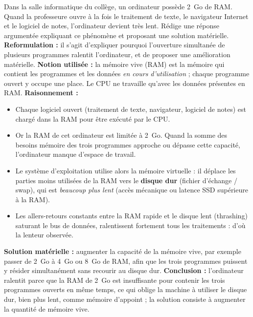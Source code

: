 \documentclass[11pt]{article}
\newcommand{\cle}[1]{{\popxbold\color{popdark}#1}}
\begin{document}
\begin{exoresolu}
Dans la salle informatique du collège, un ordinateur possède \SI{2}{Go} de RAM. Quand la professeure ouvre à la fois le traitement de texte, le navigateur Internet et le logiciel de notes, l'ordinateur devient très lent. Rédige une réponse argumentée expliquant ce phénomène et proposant une solution matérielle.
\tcblower
\textbf{Reformulation :} il s'agit d'expliquer pourquoi l'ouverture simultanée de plusieurs programmes ralentit l'ordinateur, et de proposer une amélioration matérielle.
\textbf{Notion utilisée :} la \cle{mémoire vive} (RAM) est la mémoire qui contient les programmes et les données \emph{en cours d'utilisation} ; chaque programme ouvert y occupe une place. Le CPU ne travaille qu'avec les données présentes en RAM.
\textbf{Raisonnement :}
\begin{itemize}
\item Chaque logiciel ouvert (traitement de texte, navigateur, logiciel de notes) est chargé dans la RAM pour être exécuté par le CPU.
\item Or la RAM de cet ordinateur est limitée à \SI{2}{Go}. Quand la somme des besoins mémoire des trois programmes approche ou dépasse cette capacité, l'ordinateur manque d'espace de travail.
\item Le système d'exploitation utilise alors la \cle{mémoire virtuelle} : il déplace les parties moins utilisées de la RAM vers le \textbf{disque dur} (fichier d'échange / swap), qui est \emph{beaucoup plus lent} (accès mécanique ou latence SSD supérieure à la RAM).
\item Les allers-retours constants entre la RAM rapide et le disque lent (thrashing) saturant le bus de données, ralentissent fortement tous les traitements : d'où la lenteur observée.
\end{itemize}
\textbf{Solution matérielle :} augmenter la capacité de la mémoire vive, par exemple passer de \SI{2}{Go} à \SI{4}{Go} ou \SI{8}{Go} de RAM, afin que les trois programmes puissent y résider simultanément sans recourir au disque dur.
\textbf{Conclusion :} l'ordinateur ralentit parce que la RAM de \SI{2}{Go} est insuffisante pour contenir les trois programmes ouverts en même temps, ce qui oblige la machine à utiliser le disque dur, bien plus lent, comme mémoire d'appoint ; la solution consiste à augmenter la quantité de mémoire vive.
\end{exoresolu}
\end{document}
